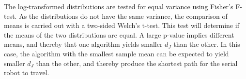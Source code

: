 The log-transformed distributions are tested for equal variance
using Fisher's F-test.
As the distributions do not have the same variance,
the comparison of means is carried out with a two-sided Welch's t-test.
This test will determine if the means of the two distributions are equal.
A large p-value implies different means, and thereby that one algorithm
yields smaller \(d_J\) than the other.
In this case, the algorithm with the smallest sample mean can be expected
to yield smaller \(d_J\) than the other, and thereby produce the shortest
path for the serial robot to travel.